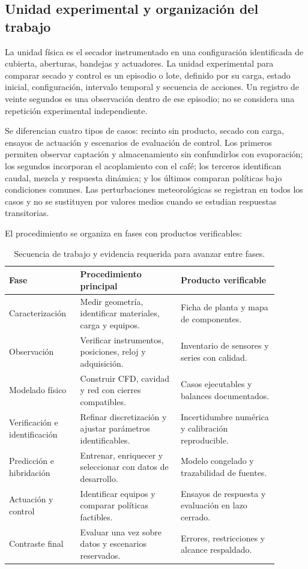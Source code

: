 \subsection{Unidad experimental y organización del trabajo}

La unidad física es el secador instrumentado en una configuración identificada de cubierta, aberturas, bandejas y actuadores. La unidad experimental para comparar secado y control es un episodio o lote, definido por su carga, estado inicial, configuración, intervalo temporal y secuencia de acciones. Un registro de veinte segundos es una observación dentro de ese episodio; no se considera una repetición experimental independiente.

Se diferencian cuatro tipos de casos: recinto sin producto, secado con carga, ensayos de actuación y escenarios de evaluación de control. Los primeros permiten observar captación y almacenamiento sin confundirlos con evaporación; los segundos incorporan el acoplamiento con el café; los terceros identifican caudal, mezcla y respuesta dinámica; y los últimos comparan políticas bajo condiciones comunes. Las perturbaciones meteorológicas se registran en todos los casos y no se sustituyen por valores medios cuando se estudian respuestas transitorias.

El procedimiento se organiza en fases con productos verificables:
\begin{table}[htbp]
\centering
\small
\caption{Secuencia de trabajo y evidencia requerida para avanzar entre fases.}
\label{met:tabla_fases}
\begin{tabular}{>{\raggedright\arraybackslash}p{0.22\linewidth}>{\raggedright\arraybackslash}p{0.34\linewidth}>{\raggedright\arraybackslash}p{0.33\linewidth}}
\toprule
Fase & Procedimiento principal & Producto verificable \\
\midrule
Caracterización & Medir geometría, identificar materiales, carga y equipos. & Ficha de planta y mapa de componentes. \\
Observación & Verificar instrumentos, posiciones, reloj y adquisición. & Inventario de sensores y series con calidad. \\
Modelado físico & Construir CFD, cavidad y red con cierres compatibles. & Casos ejecutables y balances documentados. \\
Verificación e identificación & Refinar discretización y ajustar parámetros identificables. & Incertidumbre numérica y calibración reproducible. \\
Predicción e hibridación & Entrenar, enriquecer y seleccionar con datos de desarrollo. & Modelo congelado y trazabilidad de fuentes. \\
Actuación y control & Identificar equipos y comparar políticas factibles. & Ensayos de respuesta y evaluación en lazo cerrado. \\
Contraste final & Evaluar una vez sobre datos y escenarios reservados. & Errores, restricciones y alcance respaldado. \\
\bottomrule
\end{tabular}
\end{table}

